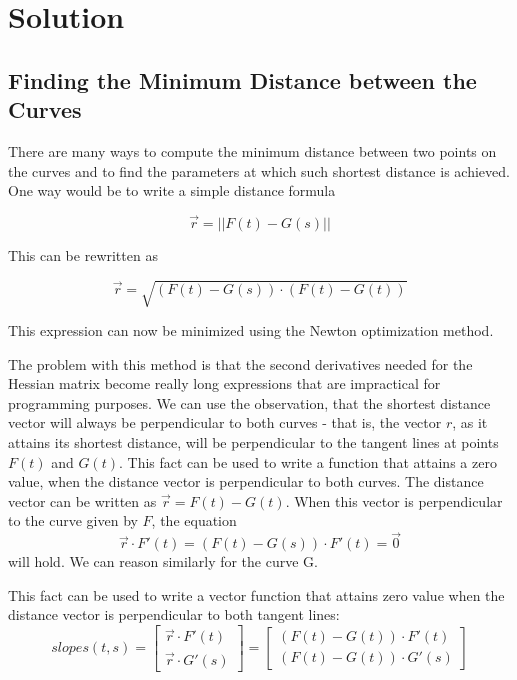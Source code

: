 \documentclass[A4]{article}
\begin{document}
\section{Solution}

\subsection{Finding the Minimum Distance between the Curves}
There are many ways to compute the minimum distance between two points on the curves and to find the parameters at which such shortest distance is achieved.
One way would be to write a simple distance formula

\begin{equation}
\vec{r} = || F(t) - G(s) ||
\end{equation}

This can be rewritten as

\begin{equation}
\vec{r} = \sqrt{ (F(t) - G(s)) \cdot (F(t) - G(t)) }
\end{equation}

This expression can now be minimized using the Newton optimization method.

The problem with this method is that the second derivatives needed for the Hessian matrix become really long expressions that are impractical for programming purposes. We can use the observation, that the shortest distance vector will always be perpendicular to both curves - that is, the vector $ r $, as it attains its shortest distance, will be perpendicular to the tangent lines at points $F(t)$ and $G(t)$. This fact can be used to write a function that attains a zero value, when the distance vector is perpendicular to both curves. The distance vector can be written as $ \vec{r} = F(t) - G(t) $. When this vector is perpendicular to the curve given by $ F $, the equation 
\begin{equation}
\vec{r} \cdot F'(t) = (F(t) - G(s)) \cdot F'(t) = \vec{0} 
\end{equation}
will hold. We can reason
similarly for the curve G.

This fact can be used to write a vector function that attains zero value when the distance vector is perpendicular to both tangent lines:
\begin{equation}
slopes(t, s) = \begin{bmatrix} \vec{r} \cdot F'(t) \\ \vec{r} \cdot G'(s)\end{bmatrix} = \begin{bmatrix} (F(t) - G(t)) \cdot F'(t) \\ (F(t) - G(t)) \cdot G'(s)  \end{bmatrix}
\end{equation}
\end{document}
